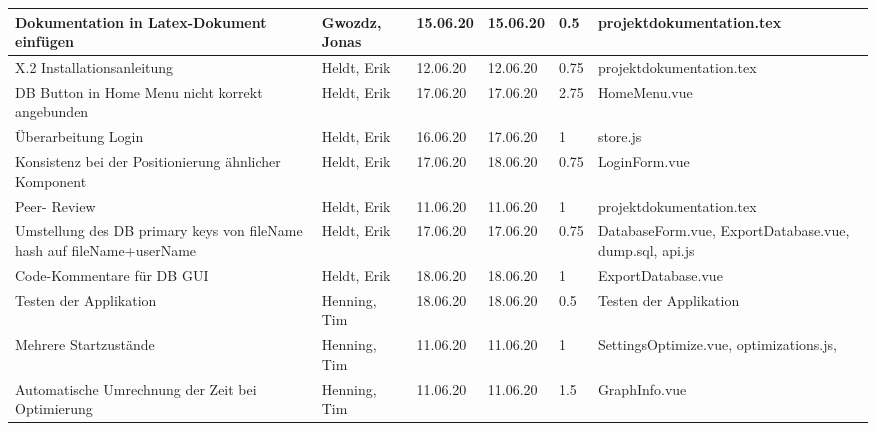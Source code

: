 \begin{longtable}{|p{4cm}|p{2cm}|p{1.2cm}|p{1.2cm}|p{0.7cm}|p{3.8cm}|}
      Dokumentation in Latex-Dokument einfügen                               & Gwozdz, Jonas         & 15.06.20 & 15.06.20 & 0.5  & projektdokumentation.tex                                  \\ \hline
      X.2 Installationsanleitung                                             & Heldt, Erik           & 12.06.20 & 12.06.20 & 0.75 & projektdokumentation.tex                                  \\ \hline
      DB Button in Home Menu nicht korrekt angebunden                        & Heldt, Erik           & 17.06.20 & 17.06.20 & 2.75 & HomeMenu.vue                                              \\ \hline
      Überarbeitung Login                                                    & Heldt, Erik           & 16.06.20 & 17.06.20 & 1    & store.js                                                  \\ \hline
      Konsistenz bei der Positionierung ähnlicher Komponent                  & Heldt, Erik           & 17.06.20 & 18.06.20 & 0.75 & LoginForm.vue                                             \\ \hline
      Peer- Review                                                           & Heldt, Erik           & 11.06.20 & 11.06.20 & 1    & projektdokumentation.tex                                  \\ \hline
      Umstellung des DB primary keys von fileName hash auf fileName+userName & Heldt, Erik           & 17.06.20 & 17.06.20 & 0.75 & DatabaseForm.vue, ExportDatabase.vue, dump.sql, api.js    \\ \hline
      Code-Kommentare für DB GUI                                             & Heldt, Erik           & 18.06.20 & 18.06.20 & 1    & ExportDatabase.vue                                        \\ \hline
      Testen der Applikation                                                 & Henning, Tim          & 18.06.20 & 18.06.20 & 0.5  & Testen der Applikation                                    \\ \hline
      Mehrere Startzustände                                                  & Henning, Tim          & 11.06.20 & 11.06.20 & 1    & SettingsOptimize.vue, optimizations.js,                   \\ \hline
      Automatische Umrechnung der Zeit bei Optimierung                       & Henning, Tim          & 11.06.20 & 11.06.20 & 1.5  & GraphInfo.vue                                             \\ \hline

\end{longtable}
